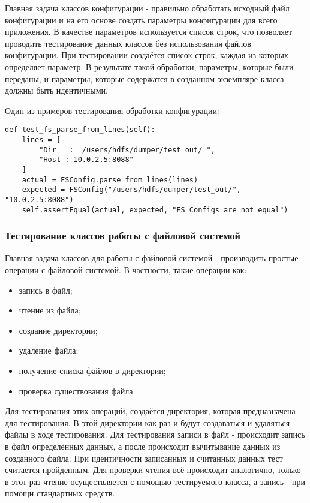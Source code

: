 Главная задача классов конфигурации - правильно обработать исходный файл конфигурации и на его основе создать параметры конфигурации для всего приложения.
В качестве параметров используется список строк, что позволяет проводить тестирование данных классов без использования файлов конфигурации.
При тестировании создаётся список строк, каждая из которых определяет параметр.
В результате такой обработки, параметры, которые были переданы, и параметры, которые содержатся в созданном экземпляре класса должны быть идентичными.

Один из примеров тестирования обработки конфигурации:
\begin{lstlisting}
def test_fs_parse_from_lines(self):
    lines = [
        "Dir   :  /users/hdfs/dumper/test_out/ ",
        "Host : 10.0.2.5:8088"
    ]
    actual = FSConfig.parse_from_lines(lines)
    expected = FSConfig("/users/hdfs/dumper/test_out/", "10.0.2.5:8088")
    self.assertEqual(actual, expected, "FS Configs are not equal")
\end{lstlisting}

\subsubsection{Тестирование классов работы с файловой системой}

Главная задача классов для работы с файловой системой - производить простые операции с файловой системой.
В частности, такие операции как:
\begin{itemize}
    \item запись в файл;
    \item чтение из файла;
    \item создание директории;
    \item удаление файла;
    \item получение списка файлов в директории;
    \item проверка существования файла.
\end{itemize}

Для тестирования этих операций, создаётся директория, которая предназначена для тестирования.
В этой директории как раз и будут создаваться и удаляться файлы в ходе тестирования.
Для тестирования записи в файл - происходит запись в файл определённых данных, а после происходит вычитывание данных из созданного файла.
При идентичности записанных и считанных данных тест считается пройденным.
Для проверки чтения всё происходит аналогично, только в этот раз чтение осуществляется с помощью тестируемого класса, а запись - при помощи стандартных средств.

